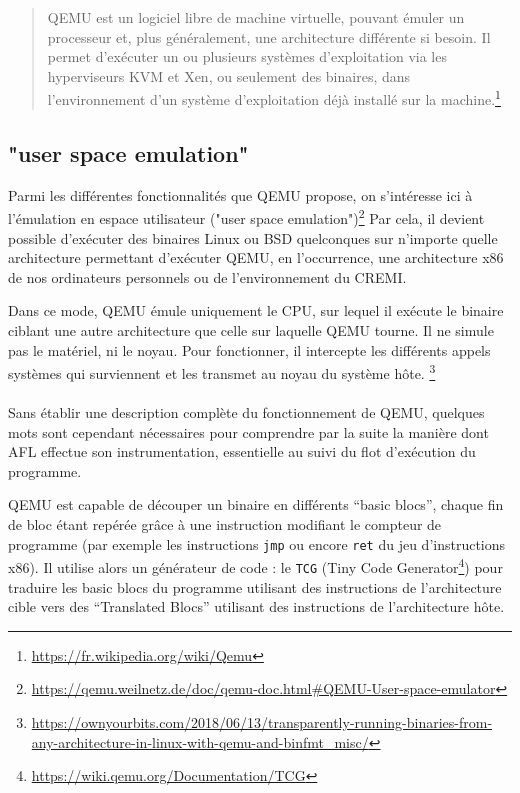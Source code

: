 \begin{quote}
QEMU est un logiciel libre de machine virtuelle, pouvant émuler un processeur et, plus généralement, une architecture différente si besoin. Il permet d'exécuter un ou plusieurs systèmes d'exploitation via les hyperviseurs KVM et Xen, ou seulement des binaires, dans l'environnement d'un système d'exploitation déjà installé sur la machine.\footnote{\url{https://fr.wikipedia.org/wiki/Qemu}}
\end{quote}

\subsection{"user space emulation"}

Parmi les différentes fonctionnalités que QEMU propose, on s'intéresse ici à l'émulation en espace utilisateur ("user space emulation")\footnote{\url{https://qemu.weilnetz.de/doc/qemu-doc.html\#QEMU-User-space-emulator}}
Par cela, il devient possible d'exécuter des binaires Linux ou BSD quelconques sur n'importe quelle architecture permettant d'exécuter QEMU, en l'occurrence, une architecture x86 de nos ordinateurs personnels ou de l'environnement du CREMI.

Dans ce mode, QEMU émule uniquement le CPU, sur lequel il exécute le binaire ciblant une autre architecture que celle sur laquelle QEMU tourne.
Il ne simule pas le matériel, ni le noyau.
Pour fonctionner, il intercepte les différents appels systèmes qui surviennent et les transmet au noyau du système hôte.
\footnote{\url{https://ownyourbits.com/2018/06/13/transparently-running-binaries-from-any-architecture-in-linux-with-qemu-and-binfmt_misc/}}

\paragraph{}
Sans établir une description complète du fonctionnement de QEMU, quelques mots sont cependant nécessaires pour comprendre par la suite la manière dont AFL effectue son instrumentation, essentielle au suivi du flot d'exécution du programme.

QEMU est capable de découper un binaire en différents ``basic blocs'', chaque fin de bloc étant repérée grâce à une instruction modifiant le compteur de programme (par exemple les instructions \lstinline{jmp} ou encore \lstinline{ret} du jeu d'instructions x86).
Il utilise alors un générateur de code : le \lstinline{TCG} (Tiny Code Generator\footnote{\url{https://wiki.qemu.org/Documentation/TCG}}) pour traduire les basic blocs du programme utilisant des instructions de l'architecture cible vers des ``Translated Blocs'' utilisant des instructions de l'architecture hôte.

